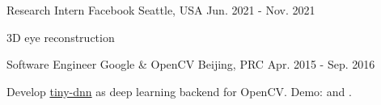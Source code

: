 


\begin{cventries}


\cventry
{Research Intern} %
{Facebook} %
{Seattle, USA} %
{Jun. 2021 - Nov. 2021} %
{ %
\begin{cvitems}
\item {3D eye reconstruction}
\end{cvitems}
}

\cventry
{Software Engineer} %
{Google \& OpenCV} %
{Beijing, PRC} %
{Apr. 2015 - Sep. 2016} %
{ %
\begin{cvitems}
\item {Develop \href{https://github.com/tiny-dnn/tiny-dnn}{tiny-dnn} as deep learning backend for OpenCV. Demo: \href{https://www.youtube.com/watch?v=Mc20rTYdXTE}{} and \href{https://drive.google.com/open?id=0B-RYa1FDOrYXVUEzcG1mdnl5a3M}{}.
}
\end{cvitems}
}


\end{cventries}
